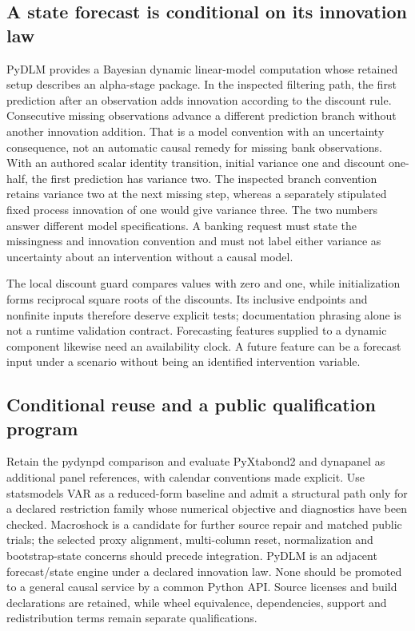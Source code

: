 \subsection{A state forecast is conditional on its innovation law}

PyDLM provides a Bayesian dynamic linear-model computation whose retained setup describes an alpha-stage package. In the inspected filtering path, the first prediction after an observation adds innovation according to the discount rule. Consecutive missing observations advance a different prediction branch without another innovation addition. That is a model convention with an uncertainty consequence, not an automatic causal remedy for missing bank observations. With an authored scalar identity transition, initial variance one and discount one-half, the first prediction has variance two. The inspected branch convention retains variance two at the next missing step, whereas a separately stipulated fixed process innovation of one would give variance three. The two numbers answer different model specifications. A banking request must state the missingness and innovation convention and must not label either variance as uncertainty about an intervention without a causal model.\citep{exec25_pydyn_pydlm,exec25_pydyn_choice}

The local discount guard compares values with zero and one, while initialization forms reciprocal square roots of the discounts. Its inclusive endpoints and nonfinite inputs therefore deserve explicit tests; documentation phrasing alone is not a runtime validation contract. Forecasting features supplied to a dynamic component likewise need an availability clock. A future feature can be a forecast input under a scenario without being an identified intervention variable.\citep{exec25_pydyn_pydlm}

\subsection{Conditional reuse and a public qualification program}

Retain the pydynpd comparison and evaluate PyXtabond2 and dynapanel as additional panel references, with calendar conventions made explicit. Use statsmodels VAR as a reduced-form baseline and admit a structural path only for a declared restriction family whose numerical objective and diagnostics have been checked. Macroshock is a candidate for further source repair and matched public trials; the selected proxy alignment, multi-column reset, normalization and bootstrap-state concerns should precede integration. PyDLM is an adjacent forecast/state engine under a declared innovation law. None should be promoted to a general causal service by a common Python API. Source licenses and build declarations are retained, while wheel equivalence, dependencies, support and redistribution terms remain separate qualifications.\citep{exec25_pydyn_choice}

